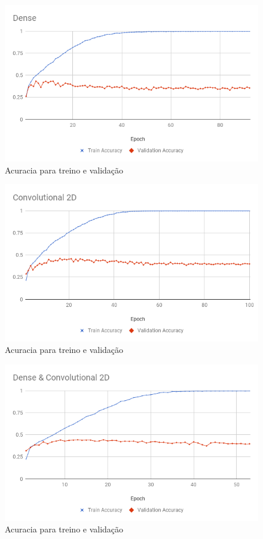 \documentclass[conference]{IEEEtran}
\begin{document}
\begin{figure}[h!]
	\includegraphics[scale=0.4]{dense.png}
	\caption{Acuracia para treino e validação}
	\label{fig:dense}
\end{figure}

\begin{figure}[h!]
	\includegraphics[scale=0.4]{conv.png}
	\caption{Acuracia para treino e validação}
	\label{fig:conv}
\end{figure}

\begin{figure}[h!]
	\includegraphics[scale=0.4]{dense_conv.png}
	\caption{Acuracia para treino e validação}
	\label{fig:dense_conv}
\end{figure}
\end{document}
